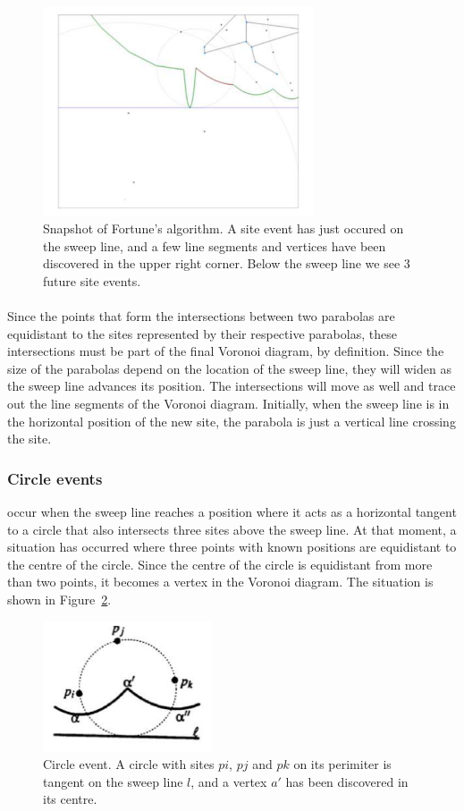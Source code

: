 \begin{figure}[]
    \centering
      \includegraphics[width=80mm]{images/fortunes.pdf}
    \caption{Snapshot of Fortune's algorithm. A site event has just occured on the sweep line, and a few line segments and vertices have been discovered in the upper right corner. Below the sweep line we see 3 future site events.}
    \label{fig:fortunes}
\end{figure}

\paragraph{}
Since the points that form the intersections between two parabolas are equidistant to the sites represented by their respective parabolas, these intersections must be part of the final Voronoi diagram, by definition. Since the size of the parabolas depend on the location of the sweep line, they will widen as the sweep line advances its position. The intersections will move as well and trace out the line segments of the Voronoi diagram. Initially, when the sweep line is in the horizontal position of the new site, the parabola is just a vertical line crossing the site.

\subsubsection{Circle events}
occur when the sweep line reaches a position where it acts as a horizontal tangent to a circle that also intersects three sites above the sweep line. At that moment, a situation has occurred where three points with known positions are equidistant to the centre of the circle. Since the centre of the circle is equidistant from more than two points, it becomes a vertex in the Voronoi diagram. The situation is shown in Figure~\ref{fig:circle_event}.

\begin{figure}[]
    \centering
      \includegraphics[width=50mm]{images/circle_event.pdf}
    \caption{Circle event. A circle with sites $pi$, $pj$ and $pk$ on its perimiter is tangent on the sweep line $l$, and a vertex $a'$  has been discovered in its centre.}
    \label{fig:circle_event}
\end{figure}

